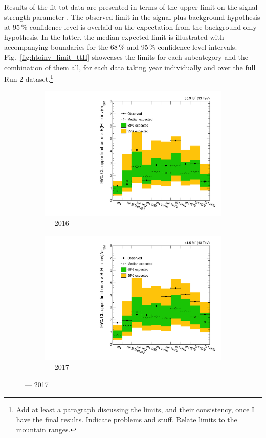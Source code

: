 Results of the fit tot data are presented in terms of the upper limit on the signal strength parameter \BRHinvFull. The observed limit in the signal plus background hypothesis at 95\,\% confidence level is overlaid on the expectation from the background-only hypothesis. In the latter, the median expected limit is illustrated with accompanying boundaries for the 68\,\% and 95\,\% confidence level intervals. Fig.~\ref{fig:htoinv_limit_ttH} showcases the limits for each \ttH subcategory and the combination of them all, for each data taking year individually and over the full Run-2 dataset.\footnote{Add at least a paragraph discussing the limits, and their consistency, once I have the final results. Indicate problems and stuff. Relate limits to the mountain ranges.}

\begin{figure}[htbp]
    \centering
    \begin{subfigure}[b]{0.45\textwidth}
        \includegraphics[width=\textwidth]{figures/limits/ttH/limit_2016_ttH.pdf}
        \caption{\ttH --- 2016}
    \end{subfigure}
    \hfill
    \begin{subfigure}[b]{0.45\textwidth}
        \includegraphics[width=\textwidth]{figures/limits/ttH/limit_2017_ttH.pdf}
        \caption{\ttH --- 2017}
    \end{subfigure}


\end{figure}
